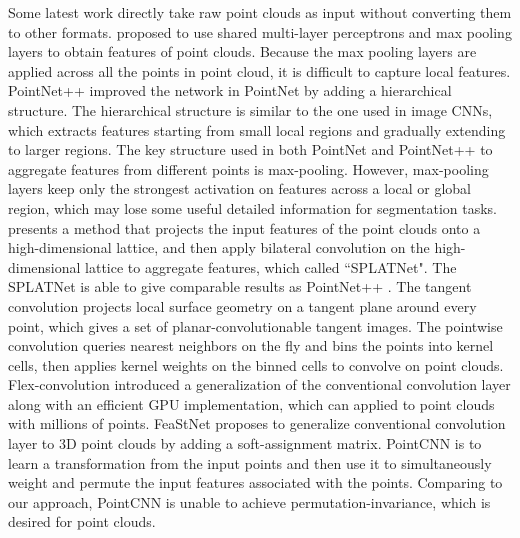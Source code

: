 \documentclass[10pt,twocolumn,letterpaper]{article}
\begin{document}
Some latest work \cite{ravanbakhsh2016deep,qi2017pointnet,qi2017pointnet++, su2018splatnet, tatarchenko2018tangent, hua2018pointwise, groh2018flex, verma2018feastnet} directly take raw point clouds as input without converting them to other formats. \cite{qi2017pointnet,ravanbakhsh2016deep} proposed to use shared multi-layer perceptrons and max pooling layers to obtain features of point clouds. Because the max pooling layers are applied across all the points in point cloud, it is difficult to capture local features. PointNet++ \cite{qi2017pointnet++} improved the network in PointNet \cite{qi2017pointnet} by adding a hierarchical structure. The hierarchical structure is similar to the one used in image CNNs, which extracts features starting from small local regions and gradually extending to larger regions. The key structure used in both PointNet \cite{qi2017pointnet} and PointNet++ \cite{qi2017pointnet++} to aggregate features from different points is max-pooling. However, max-pooling layers keep only the strongest activation on features across a local or global region, which may lose some useful detailed information for segmentation tasks. \cite{su2018splatnet} presents a method that projects the input features of the point clouds onto a high-dimensional lattice, and then apply bilateral convolution on the high-dimensional lattice to aggregate features, which called ``SPLATNet". The SPLATNet \cite{su2018splatnet} is able to give comparable results as PointNet++ \cite{qi2017pointnet++}. The tangent convolution \cite{tatarchenko2018tangent} projects local surface geometry on a tangent plane around every point, which gives a set of planar-convolutionable tangent images. The pointwise convolution \cite{hua2018pointwise} queries nearest neighbors on the fly and bins the points into kernel cells, then applies kernel weights on the binned cells to convolve on point clouds. Flex-convolution \cite{groh2018flex} introduced a generalization of the conventional convolution layer along with an efficient GPU implementation, which can applied to point clouds with millions of points. FeaStNet \cite{verma2018feastnet} proposes to generalize conventional convolution layer to 3D point clouds by adding a soft-assignment matrix. PointCNN \cite{li2018pointcnn} is to learn a transformation from the input points and then use it to simultaneously weight and permute the input features associated with the points. Comparing to our approach, PointCNN is unable to achieve permutation-invariance, which is desired for point clouds.
\end{document}
